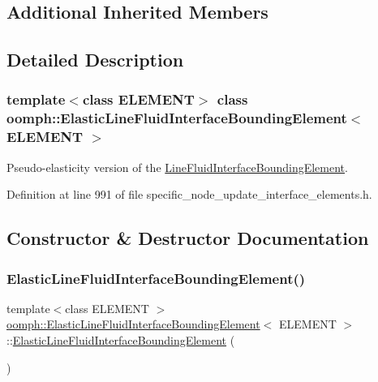 \subsection*{Additional Inherited Members}


\subsection{Detailed Description}
\subsubsection*{template$<$class E\+L\+E\+M\+E\+NT$>$\newline
class oomph\+::\+Elastic\+Line\+Fluid\+Interface\+Bounding\+Element$<$ E\+L\+E\+M\+E\+N\+T $>$}

Pseudo-\/elasticity version of the \hyperlink{classoomph_1_1LineFluidInterfaceBoundingElement}{Line\+Fluid\+Interface\+Bounding\+Element}. 

Definition at line 991 of file specific\+\_\+node\+\_\+update\+\_\+interface\+\_\+elements.\+h.



\subsection{Constructor \& Destructor Documentation}
\mbox{\label{classoomph_1_1ElasticLineFluidInterfaceBoundingElement_ad531b7e5debaecc74d64755c82bbc17d}} 
\subsubsection{\texorpdfstring{Elastic\+Line\+Fluid\+Interface\+Bounding\+Element()}{ElasticLineFluidInterfaceBoundingElement()}}
{\footnotesize\ttfamily template$<$class E\+L\+E\+M\+E\+NT $>$ \\
\hyperlink{classoomph_1_1ElasticLineFluidInterfaceBoundingElement}{oomph\+::\+Elastic\+Line\+Fluid\+Interface\+Bounding\+Element}$<$ E\+L\+E\+M\+E\+NT $>$\+::\hyperlink{classoomph_1_1ElasticLineFluidInterfaceBoundingElement}{Elastic\+Line\+Fluid\+Interface\+Bounding\+Element} (\begin{DoxyParamCaption}{ }\end{DoxyParamCaption})\hspace{0.3cm}{\ttfamily [inline]}}



